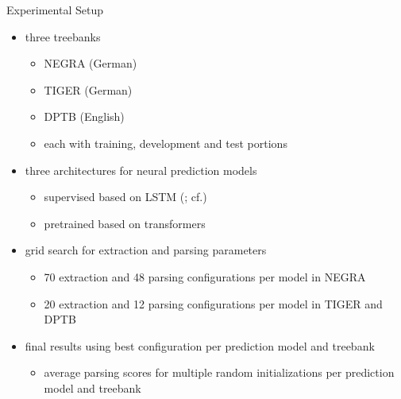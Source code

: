 \documentclass[slides]{subfiles}
\begin{document}
\begin{frame}{Experimental Setup}
        \begin{itemize}
            \item<1-> three treebanks
            \begin{itemize}
                \item NEGRA (German)
                \item TIGER (German)
                \item DPTB (English)
                \item each with training, development and test portions
            \end{itemize}
            \item<2-> three architectures for neural prediction models
            \begin{itemize}
                \item<3-> supervised based on LSTM (\citealp{Hoc97}; cf.\@ \citealp{vaswani2016supertagging, Cor20, StaSte20})
                \item<3-> pretrained based on transformers \citep[BERT-base, BERT-large or equivalent;][]{vaswani2017attention, Devlin2019}
            \end{itemize}
            \item<4-> grid search for extraction and parsing parameters
            \begin{itemize}
                \item 70 extraction and 48 parsing configurations per model in NEGRA
                \item 20 extraction and 12 parsing configurations per model in TIGER and DPTB
            \end{itemize}
            \item<5-> final results using best configuration per prediction model and treebank
            \begin{itemize}
                \item average parsing scores for multiple random initializations per prediction model and treebank
            \end{itemize}
        \end{itemize}
    \end{frame}
\end{document}
